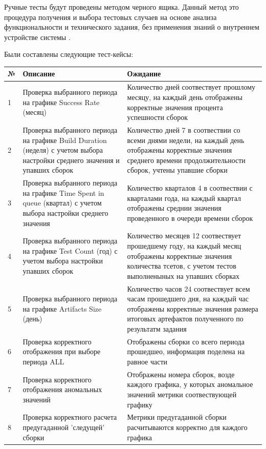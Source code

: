 Ручные тесты будут проведены методом черного ящика. Данный метод это процедура получения и выбора тестовых случаев на основе анализа функциональности и технического задания, без применения знаний о внутреннем устройстве системы \cite{blacktest}.

Были составлены следующие тест-кейсы:

\begin{table}
    \centering
    \begin{tabular}{|p{1cm}|p{5cm}|p{9cm}|}
    \hline
        № & Описание & Ожидание  \\ \hline
        1 & Проверка выбранного периода на графике Success Rate (месяц) & Количество  дней соотвествует прошлому месяцу, на каждый день отображены корректные значения процента успешности сборок\\ \hline
        2 & Проверка выбранного периода на графике Build Duration (неделя) с учетом выбора настройки среднего значения и  упавших сборок& Количество  дней 7 в соотвествии со всеми днями недели, на каждый день отображены корректные значения среднего времени продолжительности сборок, учтены упавшие сборки \\ \hline
        3 & Проверка выбранного периода на графике Time Spent in queue (квартал) с учетом выбора настройки среднего значения & Количество  кварталов 4 в соотвествии с кварталами года, на каждый квартал отображены среднии значения проведенного в очереди времени сборок  \\ \hline
        4 & Проверка выбранного периода на графике Test Count (год) с учетом выбора настройки упавших сборок & Количество  месяцев 12 соотвествует прошедшему году, на каждый месяц отображены корректные значения  количества тсетов, с учетом тестов выполненыных на упавших сборках \\ \hline
        5 & Проверка выбранного периода на графике Artifacts Size (день) & Количество  часов 24 соотвествует всем часам прошедшего дня, на каждый час отображены корректные значения размера итоговых артефактов полученного по результатм задания   \\ \hline
        6 & Проверка корректного отображения при выборе периода ALL & Отображены сборки со всего периода прошедшео, информация поделена на равное части   \\ \hline
        7 & Проверка корректного отображения аномальных значений & Отображены номера сборок, возде каждого графика, у которых аномальное значений метрики соотвествующей графику   \\ \hline
        8 & Проверка корректного расчета предугаданной 'следущей' сборки& Метрики предугаданной сборки расчитываются корректно для каждого графика   \\ \hline

    \end{tabular}
\end{table}

